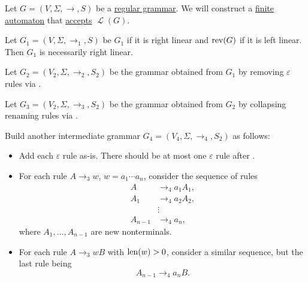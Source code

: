 \begin{algorithm}\label{alg:regular_grammar_to_automaton}
  Let \( G = (V, \Sigma, \to, S) \) be a \hyperref[def:chomsky_hierarchy/regular]{regular grammar}. We will construct a \hyperref[def:finite_automaton]{finite automaton} that \hyperref[def:finite_automaton/language]{accepts} \( \mscrL(G) \).

  \begin{thmenum}
     Let \( G_1 = (V, \Sigma, \to_1, S) \) be \( G_1 \) if it is right linear and \( \op{rev}(G) \) if it is left linear. Then \( G_1 \) is necessarily right linear.

     Let \( G_2 = (V_2, \Sigma, \to_2, S_2) \) be the grammar obtained from \( G_1 \) by removing \( \varepsilon \) rules via .

     Let \( G_3 = (V_2, \Sigma, \to_3, S_2) \) be the grammar obtained from \( G_2 \) by collapsing renaming rules via .

     Build another intermediate grammar \( G_4 = (V_4, \Sigma, \to_4, S_2) \) as follows:
    \begin{itemize}
      \item Add each \( \varepsilon \) rule as-is. There should be at most one \( \varepsilon \) rule after .
      \item For each rule \( A \to_3 w \), \( w = a_1 \cdots a_n \), consider the sequence of rules
      \begin{align*}
        A       &\to_4 a_1 A_1, \\
        A_1     &\to_4 a_2 A_2, \\
                &\vdots \\
        A_{n-1} &\to_4 a_n,
      \end{align*}
      where \( A_1, \ldots, A_{n-1} \) are new nonterminals.

      \item For each rule \( A \to_3 wB \) with \( \operatorname{len}(w) > 0 \), consider a similar sequence, but the last rule being
      \begin{equation*}
        A_{n-1} \to_4 a_n B.
      \end{equation*}
    \end{itemize}


\end{thmenum}
\end{algorithm}
